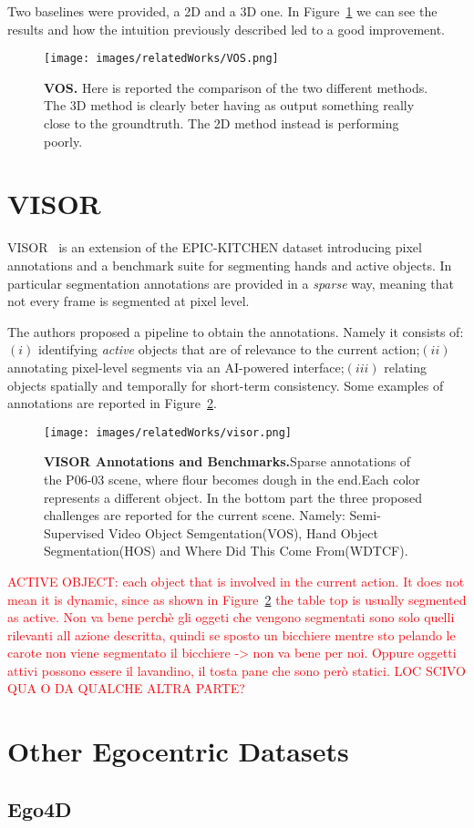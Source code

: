 Two baselines were provided, a 2D and a 3D one. In Figure~\ref{fig:VOS} we can see the results and how the intuition previously described led to a good improvement.
\begin{figure}
    \centering
    \texttt{[image: images/relatedWorks/VOS.png]} 
    \caption{\textbf{VOS.} Here is reported the comparison of the two different methods.
    The 3D method is clearly beter having as output something really close to the groundtruth. The 2D method instead is performing poorly.}\label{fig:VOS}
\end{figure}

\section{VISOR}


VISOR~\cite{visor} is an extension of the EPIC-KITCHEN dataset introducing pixel annotations and a benchmark
suite for segmenting hands and active objects. In particular segmentation annotations are provided in a \textit{sparse} way, meaning
that not every frame is segmented at pixel level.

The authors proposed a pipeline to obtain the annotations. Namely it consists of: $(i)$ identifying \textit{active} objects that are of relevance
to the current action;$(ii)$annotating pixel-level segments via an AI-powered interface;$(iii)$ relating objects spatially and temporally for short-term consistency.
Some examples of annotations are reported in Figure~\ref{fig:visor}.

\begin{figure}
    \centering
    \texttt{[image: images/relatedWorks/visor.png]} 
    \caption{\textbf{VISOR Annotations and Benchmarks.}Sparse annotations of the P06-03 scene, where flour becomes dough in the end.Each color represents a different object.
    In the bottom part the three proposed challenges are reported for the current scene. Namely: Semi-Supervised Video Object Semgentation(VOS),
     Hand Object Segmentation(HOS) and Where Did This Come From(WDTCF).}\label{fig:visor}
\end{figure}

\textcolor{red}{
ACTIVE OBJECT: each object that is involved in the current action. It does not mean it is dynamic, since as shown in Figure~\ref{fig:visor} the table top
is usually segmented as active.
Non va bene perchè gli oggeti che vengono segmentati sono solo quelli rilevanti all azione descritta, quindi se sposto un bicchiere mentre sto pelando 
le carote non viene segmentato il bicchiere -> non va bene per noi. Oppure oggetti attivi possono essere il lavandino, il tosta pane che sono
però statici. LOC SCIVO QUA O DA QUALCHE ALTRA PARTE?}
\section{Other Egocentric Datasets}
\subsection{Ego4D}

